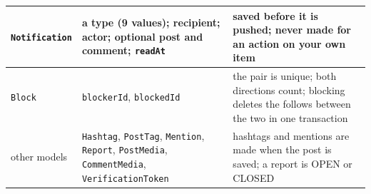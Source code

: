 {\begin{longtable}{@{}>{\raggedright\arraybackslash}p{4.0cm} >{\raggedright\arraybackslash}p{4.6cm} >{\raggedright\arraybackslash}p{\dimexpr\textwidth-8.6cm-4\tabcolsep\relax}@{}}
  \midrule
    \texttt{Notification} & a type (9 values); recipient; actor; optional post and comment; \texttt{readAt} & saved before it is pushed; never made for an action on your own item \\
  \midrule
    \texttt{Block} & \texttt{blockerId}, \texttt{blockedId} & the pair is unique; both directions count; blocking deletes the follows between the two in one transaction \\
  \midrule
    other models & \texttt{Hashtag}, \texttt{PostTag}, \texttt{Mention}, \texttt{Report}, \texttt{PostMedia}, \texttt{CommentMedia}, \texttt{VerificationToken} & hashtags and mentions are made when the post is saved; a report is OPEN or CLOSED \\
\end{longtable}}
